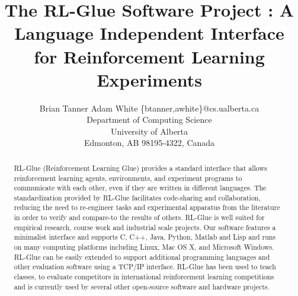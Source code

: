 \documentclass[twoside,11pt]{article}
\begin{document}
\title{The RL-Glue Software Project : A Language Independent Interface for Reinforcement Learning Experiments}




\author{\name Brian Tanner \AND Adam White  \email \{btanner,awhite\}@cs.ualberta.ca \\
       \addr Department of Computing Science\\
       University of Alberta\\
       Edmonton, AB 98195-4322, Canada}


\maketitle

\begin{abstract}%
RL-Glue (Reinforcement Learning Glue) provides a standard interface that allows reinforcement learning agents, environments, and experiment programs to communicate with each other, even if they are written in different languages. The standardization provided by RL-Glue facilitates code-sharing and collaboration, reducing the need to re-engineer tasks and experimental apparatus from the literature in order to verify and compare-to the results of others.
RL-Glue is well suited for empirical research, course work and industrial scale projects. Our software features a minimalist interface and supports C, C++, Java, Python, Matlab and Lisp and runs on many computing platforms including Linux, Mac OS X, and Microsoft Windows. RL-Glue can be easily extended to support additional programming languages and other evaluation software using a TCP/IP interface. RL-Glue has been used to teach classes, to evaluate competitors in international reinforcement learning competitions and is currently used by several other open-source software and hardware projects.
\end{abstract}
\end{document}
